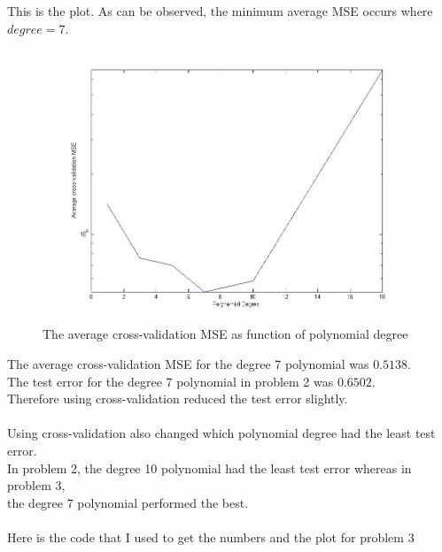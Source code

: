 \documentclass[twoside,11pt]{article}
\theoremstyle{definition}
\begin{document}
This is the plot. As can be observed, the minimum average MSE occurs where $degree=7$. \\
\begin{figure}[h]
\centering
\includegraphics[width=5 in]{prob2Plot.jpg}
\caption{The average cross-validation MSE as function of polynomial degree}
\end{figure}
The average cross-validation MSE for the degree 7 polynomial was $0.5138$.\\
The test error for the degree 7 polynomial in problem 2 was $0.6502$.\\
Therefore using cross-validation reduced the test error slightly.\\
\\
Using cross-validation also changed which polynomial degree had the least test error. \\
In problem 2, the degree 10 polynomial had the least test error whereas in problem 3, \\
the degree 7 polynomial performed the best. \\
\\
\newpage
Here is the code that I used to get the numbers and the plot for problem 3

\end{document}
